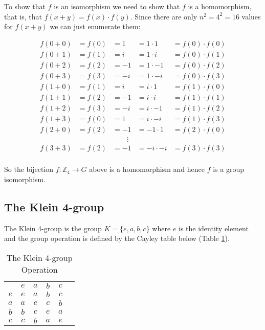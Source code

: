 \documentclass[11pt, oneside]{article}   	%
\theoremstyle{definition}
\begin{document}
\bigskip
\noindent
To show that $f$ is an isomorphism we need to show that $f$ is a homomorphism, that is, that 
$f(x+y) = f(x) \cdot f(y)$.  Since there are only $n^2 = 4^2 = 16$ values for $f(x+y)$  we can just 
enumerate them:

\begin{equation*}
\begin{array}{lllll}
f(0+0) &= f(0) &= 1  &= 1 \cdot 1     &=  f(0) \cdot f(0) \\
f(0+1) &= f(1) &= i   &= 1 \cdot i      &=  f(0) \cdot f(1) \\
f(0+2) &= f(2) &= -1 &= 1 \cdot -1   &=  f(0) \cdot f(2)  \\
f(0+3) &= f(3) &= -i  &= 1 \cdot  -i    &=  f(0) \cdot f(3) \\
f(1+0) &= f(1) &= i   &=  i \cdot 1      &=  f(1) \cdot f(0) \\
f(1+1) &= f(2) &= -1 &=  i \cdot i       &=  f(1) \cdot f(1)  \\
f(1+2) &= f(3) &= -i  &=  i \cdot  -1    &=  f(1) \cdot f(2) \\
f(1+3) &= f(0) &= 1  &=  i \cdot -i      &=  f(1) \cdot f(3) \\
f(2+0) &= f(2) &= -1 &=  -1 \cdot 1    &=  f(2) \cdot f(0)  \\
&& \qquad \vdots                                                           \\
f(3+3) &= f(2) &= -1 &=  -i \cdot -i   &=  f(3) \cdot f(3)  \\
\end{array}
\end{equation*}

\bigskip
\noindent
So the bijection $f: \mathbb{Z}_4 \rightarrow G$ above is a homomorphism and hence $f$ is a group isomorphism.


\subsection{The Klein 4-group}
\label{subsub:klein}

The Klein 4-group is the group $K = \{e,a,b,c\}$ where $e$ is the identity element and the group operation
is defined by the Cayley table below (Table \ref{tab:klein}).

\bigskip
\begin{table}[H]
\centering
\begin{tabular}{c | c c c c c} 
& $e$ & $a$ & $b$ & $c$ \\
\cline{1-5}
$e$ & $e$ & $a$ & $b$ & $c$ \\
$a$ & $a$ & $e$ & $c$ & $b$ \\
$b$ & $b$ & $c$ & $e$ & $a$ \\
$c$ & $c$ & $b$ & $a$ & $e$
\end{tabular}
\caption{The Klein 4-group Operation} 
\label{tab:klein}
\end{table}
\end{document}
